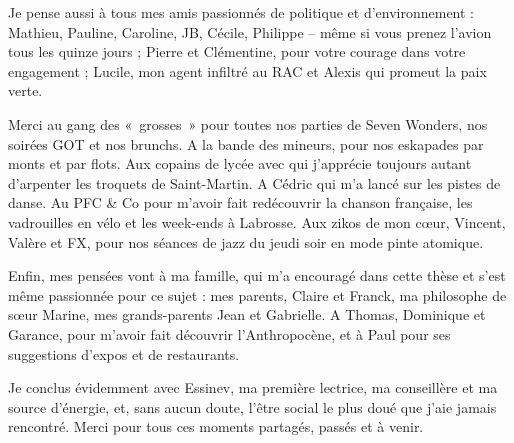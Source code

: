 Je pense aussi à tous mes amis passionnés de politique et d’environnement : Mathieu, Pauline, Caroline, JB, Cécile, Philippe – même si vous prenez l’avion tous les quinze jours ; Pierre et Clémentine, pour votre courage dans votre engagement ; Lucile, mon agent infiltré au RAC et Alexis qui promeut la paix verte.

Merci au gang des «~grosses~» pour toutes nos parties de Seven Wonders, nos soirées GOT et nos brunchs. A la bande des mineurs, pour nos eskapades par monts et par flots. Aux copains de lycée avec qui j’apprécie toujours autant d’arpenter les troquets de Saint-Martin. A Cédric qui m’a lancé sur les pistes de danse. Au PFC \& Co pour m’avoir fait redécouvrir la chanson française, les vadrouilles en vélo et les week-ends à Labrosse. Aux zikos de mon c\oe{}ur, Vincent, Valère et FX, pour nos séances de jazz du jeudi soir en mode pinte atomique.

Enfin, mes pensées vont à ma famille, qui m’a encouragé dans cette thèse et s’est même passionnée pour ce sujet : mes parents, Claire et Franck, ma philosophe de sœur Marine, mes grands-parents Jean et Gabrielle. A Thomas, Dominique et Garance, pour m’avoir fait découvrir l’Anthropocène, et à Paul pour ses suggestions d’expos et de restaurants. 

Je conclus évidemment avec Essinev, ma première lectrice, ma conseillère et ma source d’énergie, et, sans aucun doute, l’être social le plus doué que j’aie jamais rencontré. Merci pour tous ces moments partagés, passés et à venir. 

